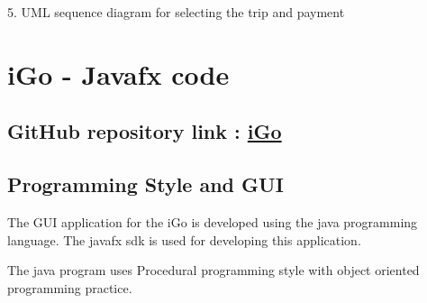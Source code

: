 \documentclass[a4paper,12pt]{article}
\begin{document}
\begin{center}
\caption{5. UML sequence diagram for selecting the trip and payment}
\end{center}

\newpage
\section{iGo - Javafx code}
\subsection{GitHub repository link : \href{https://github.com/singlapiyush1/SDM-Project/tree/main/Code}{iGo}}

\subsection{Programming Style and GUI}
The GUI application for the iGo is developed using the java programming language. The javafx sdk is used for developing this application. \\ \par
The java program uses Procedural programming style with object oriented programming practice.
\end{document}
